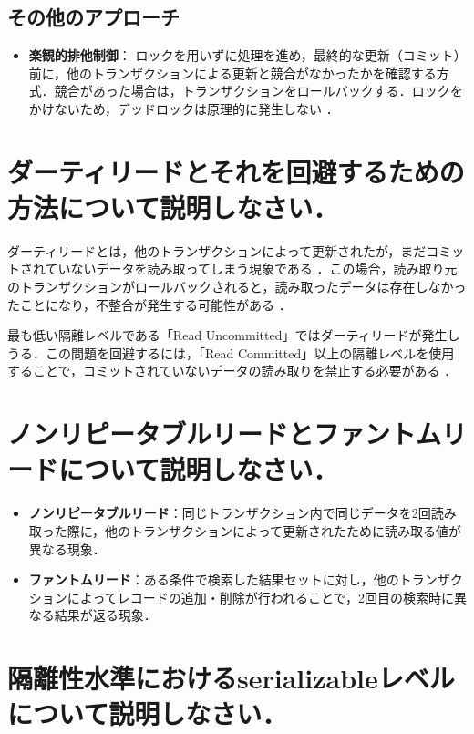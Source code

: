 \documentclass[titlepage,a4paper]{jsarticle}
\begin{document}
\subsection*{その他のアプローチ}
\begin{itemize}
    \item \textbf{楽観的排他制御}： ロックを用いずに処理を進め，最終的な更新（コミット）前に，他のトランザクションによる更新と競合がなかったかを確認する方式．競合があった場合は，トランザクションをロールバックする．ロックをかけないため，デッドロックは原理的に発生しない ．
\end{itemize}

\section{ダーティリードとそれを回避するための方法について説明しなさい．}

ダーティリードとは，他のトランザクションによって更新されたが，まだコミットされていないデータを読み取ってしまう現象である ．この場合，読み取り元のトランザクションがロールバックされると，読み取ったデータは存在しなかったことになり，不整合が発生する可能性がある ．

最も低い隔離レベルである「Read Uncommitted」ではダーティリードが発生しうる．この問題を回避するには，「Read Committed」以上の隔離レベルを使用することで，コミットされていないデータの読み取りを禁止する必要がある ．

\section{ノンリピータブルリードとファントムリードについて説明しなさい．}

\begin{itemize}
  \item \textbf{ノンリピータブルリード}：同じトランザクション内で同じデータを2回読み取った際に，他のトランザクションによって更新されたために読み取る値が異なる現象．
  \item \textbf{ファントムリード}：ある条件で検索した結果セットに対し，他のトランザクションによってレコードの追加・削除が行われることで，2回目の検索時に異なる結果が返る現象．
\end{itemize}

\section{隔離性水準におけるserializableレベルについて説明しなさい．}
\end{document}

